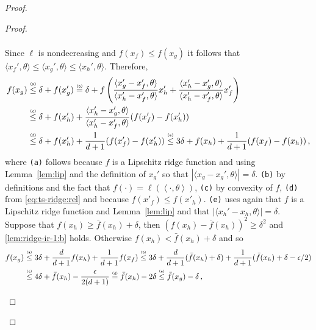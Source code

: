 \documentclass[letter, 12pt]{report}
\newcommand{\explan}[1]{\stackrel{\text{\tiny \texttt{#1}}}}
\newcommand{\ip}[1]{\left \langle #1 \right \rangle}
\newcommand{\sip}[1]{\langle #1 \rangle}
\newcommand{\1}{\mathbf{1}}
\theoremstyle{plain}
\theoremstyle{definition}
\theoremstyle{remark}
\begin{document}
\begin{proof}
\begin{proof}
\begin{enumcases}
\begin{align}
            \end{align}
            Since $\ell$ is nondecreasing and $f(x_f) \leq f(x_g)$ it follows that $\sip{x_f', \theta} \leq \sip{x_g', \theta} \leq \sip{x_h', \theta}$.
            Therefore,
            \begin{align}
                f(x_g)
                 & \explan{(a)}\leq \delta + f(x_g')                                                                                 \nonumber
                \explan{(b)}= \delta + f\left(\frac{\sip{x_g' - x_f', \theta}}{\sip{x_h' - x_f', \theta}} x_h' + \frac{\sip{x_h' - x_g', \theta}}{\sip{x_h' - x_f',\theta}} x_f'\right) \nonumber \\
                 & \explan{(c)}\leq \delta + f(x_h') + \frac{\sip{x_h' - x_g', \theta}}{\sip{x_h' - x_f', \theta}} (f(x_f') - f(x_h')) \nonumber                                                  \\
                 & \explan{(d)}\leq \delta + f(x_h') + \frac{1}{d+1} (f(x_f') - f(x_h'))
                \explan{(e)}\leq 3 \delta + f(x_h) + \frac{1}{d+1} (f(x_f) - f(x_h)) \,, \label{eq:ts-ridge:1}
            \end{align}
            where \texttt{(a)} follows because $f$ is a Lipschitz ridge function and using Lemma~\ref{lem:lip} and the definition of $x_g'$ so that
            $|\sip{x_g - x_g', \theta}| = \delta$.
            \texttt{(b)} by definitions and the fact that $f(\cdot) = \ell(\ip{\cdot, \theta})$,
            \texttt{(c)} by convexity of $f$,
            \texttt{(d)} from \cref{eq:ts-ridge:rel} and because $f(x'_f) \leq f(x'_h)$.
            \texttt{(e)} uses again that $f$ is a Lipschitz ridge function and Lemma~\ref{lem:lip} and that $|\sip{x_h' - x_h, \theta}| = \delta$.
            Suppose that $f(x_h) \geq \bar f(x_h) + \delta$, then $(f(x_h) - \bar f(x_h))^2 \geq \delta^2$ and \ref{lem:ridge-ir-1:b} holds.
            Otherwise $f(x_h) < \bar f(x_h) + \delta$ and so
            \begin{align*}
                f(x_g)
                 & \explan{(a)}\leq 3 \delta + \frac{d}{d+1} f(x_h) + \frac{1}{d+1} f(x_f)
                \explan{(b)}\leq 3 \delta + \frac{d}{d+1} (\bar f(x_h) + \delta) + \frac{1}{d+1} (\bar f(x_h) + \delta - \epsilon / 2) \\
                 & \explan{(c)}\leq 4 \delta + \bar f(x_h) - \frac{\epsilon}{2(d+1)}
                \explan{(d)}= \bar f(x_h) - 2\delta
                \explan{(e)}\leq \bar f(x_g) - \delta \,,
            \end{align*}

\end{enumcases}
\end{proof}
\end{proof}
\end{document}
